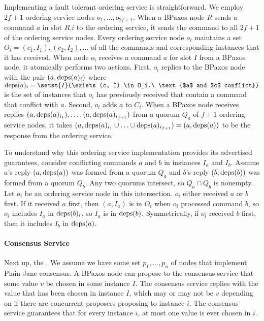\documentclass{mwhittaker}
\begin{document}
Implementing a fault tolerant ordering service is straightforward. We employ
$2f + 1$ ordering service nodes $o_{1}, \ldots, o_{2f + 1}$. When a BPaxos node
$R$ sends a command $a$ in slot $R.i$ to the ordering service, it sends the
command to all $2f + 1$ of the ordering service nodes. Every ordering service
node $o_i$ maintains a set $O_i = {(c_1, I_1), (c_2, I_2), \ldots}$ of all the
commands and corresponding instances that it has received. When node $o_i$
receives a command $a$ for slot $I$ from a BPaxos node, it atomically performs
two actions.
%
First, $o_i$ replies to the BPaxos node with the pair $(a, \text{deps}(a)_i)$ where
$\deps{a}_i = \setst{I}{\exists (c, I) \in O_i.\ \text{$a$ and $c$ conflict}}$
is the set of instances that $o_i$ has previously received that contain a
command that conflict with $a$.
%
Second, $o_i$ adds $a$ to $C_i$. When a BPaxos node receives replies $(a,
\text{deps}(a)_{i_1}), \ldots, (a, \text{deps}(a)_{i_{f+1}})$ from a quorum $Q_a$ of $f +
1$ ordering service nodes, it takes $(a, \text{deps}(a)_{i_1} \cup \ldots \cup
\text{deps}(a)_{i_{f+1}}) = (a, \text{deps}(a))$ to be the response from the ordering
service.

To understand why this ordering service implementation provides its advertised
guarantees, consider conflicting commands $a$ and $b$ in instances $I_a$ and
$I_b$. Assume $a$'s reply $(a, \text{deps}(a))$ was formed from a quorum $Q_a$ and
$b$'s reply $(b, \text{deps}(b))$ was formed from a quorum $Q_b$. Any two quorums
intersect, so $Q_a \cap Q_b$ is nonempty. Let $o_i$ be an ordering service node
in this intersection. $o_i$ either received $a$ or $b$ first. If it received
$a$ first, then $(a, I_a)$ is in $O_i$ when $o_i$ processed command $b$, so
$o_i$ includes $I_a$ in $\text{deps}(b)_i$, so $I_a$ is in $\text{deps}(b)$. Symmetrically,
if $o_i$ received $b$ first, then it includes $I_b$ in $\text{deps}(a)$.

\paragraph{Consensus Service}
Next up, the . We assume we have some set $p_1,
\ldots, p_n$ of nodes that implement Plain Jane consensus. A BPaxos node can
propose to the consensus service that some value $v$ be chosen in some instance
$I$. The consensus service replies with the value that has been chosen in
instance $I$, which may or may not be $v$ depending on if there are concurrent
proposers proposing to instance $i$. The consensus service guarantees that for
every instance $i$, at most one value is ever chosen in $i$.
\end{document}
